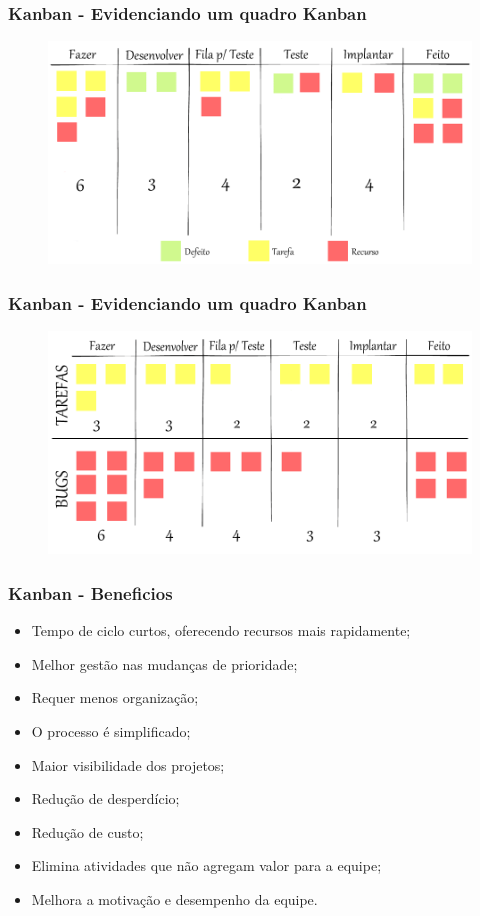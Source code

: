 \begin{frame}
 \frametitle{Kanban - Evidenciando um quadro Kanban}
  \begin{figure}
   \centering
   \includegraphics[width = \textwidth]{figs/kanban-quadro.png}
  \end{figure}
\end{frame}

\begin{frame}
 \frametitle{Kanban - Evidenciando um quadro Kanban}
  \begin{figure}
   \centering
   \includegraphics[width = \textwidth]{figs/kanban-quadro-rais.png}
  \end{figure}
\end{frame}

\begin{frame}
 \frametitle{Kanban - Beneficios}
  \begin{itemize}
  \item Tempo de ciclo curtos, oferecendo recursos mais rapidamente;
    \item Melhor gestão nas mudanças de prioridade;
    \item Requer menos organização;
    \item O processo é simplificado;
    \item Maior visibilidade dos projetos;
    \item Redução de desperdício;
    \item Redução de custo;
    \item Elimina atividades que não agregam valor para a equipe;
    \item Melhora a motivação e desempenho da equipe.
 \end{itemize}
\end{frame}

